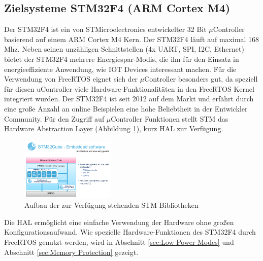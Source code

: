 \subsection{Zielsysteme STM32F4 (ARM Cortex M4)}
\label{sec:Zielsysteme}
Der STM32F4 ist ein von STMicroelectronics entwickelter 32 Bit $\mu$Controller basierend auf einem ARM Cortex M4 Kern. Der STM32F4 läuft auf maximal 168 Mhz. Neben seinen unzähligen Schnittstellen (4x UART, SPI, I2C, Ethernet) bietet der STM32F4 mehrere Energiespar-Modis, die ihn für den Einsatz in energieeffiziente Anwendung, wie IOT Devices interessant machen. Für die Verwendung von FreeRTOS eignet sich der $\mu$Controller besonders gut, da speziell für diesen uController viele Hardware-Funk\-tio\-na\-li\-tät\-en in den FreeRTOS Kernel integriert wurden. Der STM32F4 ist seit 2012 auf dem Markt und erfährt durch eine große Anzahl an online Beispielen eine hohe Beliebtheit in der Entwickler Community. Für den Zugriff auf $\mu$Controller Funktionen stellt STM das Hardware Abstraction Layer (Abbildung \ref{fig:HAL}), kurz HAL zur Verfügung.      
\begin{figure}[htb!]
	\centering
		\includegraphics[width=0.4\textwidth]{Pictures/STM32F4/LibraryEntry.png}
	\caption{Aufbau der zur Verfügung stehenden STM Bibliotheken }
	\label{fig:HAL}
\end{figure}
\newline
Die HAL ermöglicht eine einfache Verwendung der Hardware ohne großen Konfigurationsaufwand. Wie spezielle Hardware-Funktionen des STM32F4 durch FreeRTOS genutzt werden, wird in Abschnitt \ref{sec:Low Power Modes} und Abschnitt \ref{sec:Memory Protection} gezeigt.